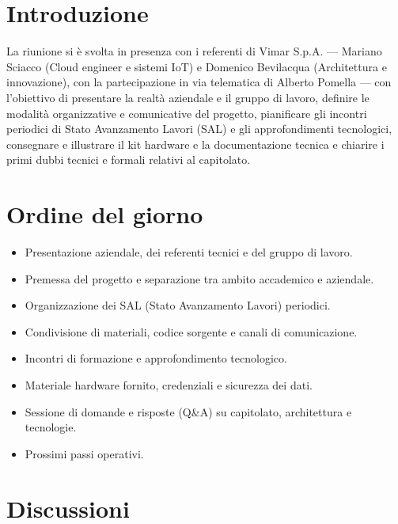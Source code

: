 \documentclass[11pt, a4paper]{article}
\begin{document}
\section{Introduzione}
La riunione si è svolta in presenza con i referenti di Vimar S.p.A. --- Mariano Sciacco (Cloud engineer e sistemi IoT) e Domenico Bevilacqua (Architettura e innovazione), con la partecipazione in via telematica di Alberto Pomella --- con l'obiettivo di presentare la realtà aziendale e il gruppo di lavoro, definire le modalità organizzative e comunicative del progetto, pianificare gli incontri periodici di Stato Avanzamento Lavori (SAL) e gli approfondimenti tecnologici, consegnare e illustrare il kit hardware e la documentazione tecnica e chiarire i primi dubbi tecnici e formali relativi al capitolato.


\section{Ordine del giorno}
\begin{itemize}
    \item Presentazione aziendale, dei referenti tecnici e del gruppo di lavoro.
    \item Premessa del progetto e separazione tra ambito accademico e aziendale.
    \item Organizzazione dei SAL (Stato Avanzamento Lavori) periodici.
    \item Condivisione di materiali, codice sorgente e canali di comunicazione.
    \item Incontri di formazione e approfondimento tecnologico.
    \item Materiale hardware fornito, credenziali e sicurezza dei dati.
    \item Sessione di domande e risposte (Q\&A) su capitolato, architettura e tecnologie.
    \item Prossimi passi operativi.
\end{itemize}


\section{Discussioni}
\end{document}
